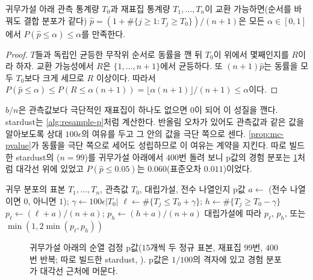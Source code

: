 \begin{proposition}
\label{prop:mc-pvalue}
귀무가설 아래 관측 통계량 $T_0$과 재표집 통계량 $T_1,\dots,T_n$이 교환 가능하면(순서를 바꿔도 결합 분포가 같다) $\hat p=(1+\#\{j\ge1:T_j\ge T_0\})/(n+1)$은 모든 $\alpha\in[0,1]$에서 $P(\hat p\le\alpha)\le\alpha$를 만족한다.
\end{proposition}

\begin{proof}
$T$들과 독립인 균등한 무작위 순서로 동률을 깬 뒤 $T_0$이 위에서 몇째인지를 $R$이라 하자. 교환 가능성에서 $R$은 $\{1,\dots,n+1\}$에서 균등하다. 또 $(n+1)\hat p$는 동률을 모두 $T_0$보다 크게 세므로 $R$ 이상이다. 따라서 $P(\hat p\le\alpha)\le P(R\le\alpha(n+1))=\lfloor\alpha(n+1)\rfloor/(n+1)\le\alpha$이다.
\end{proof}

$b/n$은 관측값보다 극단적인 재표집이 하나도 없으면 $0$이 되어 이 성질을 깬다. stardust는 \cref{alg:resample-p}처럼 계산한다. 반올림 오차가 있어도 관측값과 같은 값을 알아보도록 상대 $100\epsilon$의 여유를 두고 그 안의 값을 극단 쪽으로 센다. \cref{prop:mc-pvalue}가 동률을 극단 쪽으로 세어도 성립하므로 이 여유는 계약을 지킨다. 따로 빌드한 stardust의 ($n=99$)를 귀무가설 아래에서 $400$번 돌려 보니 p값의 경험 분포는 \cref{fig:perm-p}처럼 대각선 위에 있었고 $P(\hat p\le0.05)$는 $0.060$(표준오차 $0.011$)이었다.

\begin{algorithm}[htbp]
\begin{algorithmic}[1]
\Require 귀무 분포의 표본 $T_1,\dots,T_n$, 관측값 $T_0$, 대립가설, 전수 나열인지
\Ensure p값
\State $a\gets$ (전수 나열이면 $0$, 아니면 $1$); $\gamma\gets100\epsilon|T_0|$
\State $\ell\gets\#\{T_j\le T_0+\gamma\}$; $h\gets\#\{T_j\ge T_0-\gamma\}$
\State $p_\ell\gets(\ell+a)/(n+a)$; $p_h\gets(h+a)/(n+a)$
\State \Return 대립가설에 따라 $p_\ell$, $p_h$, 또는 $\min(1,2\min(p_\ell,p_h))$
\end{algorithmic}
\caption{재표집 p값 (stardust )}
\label{alg:resample-p}
\end{algorithm}

\begin{figure}[htbp]
\centering
{}
\caption{귀무가설 아래의 순열 검정 p값($15$개씩 두 정규 표본, 재표집 $99$번, $400$번 반복; 따로 빌드한 stardust, ). p값은 $1/100$의 격자에 있고 경험 분포가 대각선 근처에 머문다.}
\label{fig:perm-p}
\end{figure}

